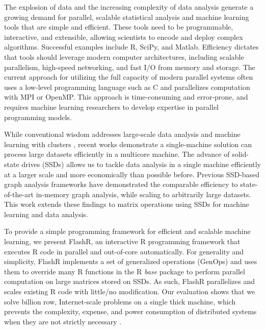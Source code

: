 
The explosion of data and the increasing complexity of data analysis
generate a growing demand for parallel, scalable statistical analysis
and machine learning tools that are simple and efficient.
These tools need to be programmable, interactive, and extensible,
allowing scientists to encode and deploy complex algorithms.
Successful examples include R, SciPy, and Matlab.  Efficiency dictates that
tools should leverage modern computer architectures, including scalable
parallelism, high-speed networking, and fast I/O from memory and storage.
The current approach for utilizing the full
capacity of modern parallel systems often uses a low-level programming
language such as C and parallelizes computation with MPI or OpenMP.
This approach is time-consuming and error-prone, and requires machine learning
researchers to develop expertise in parallel programming models.


While conventional wisdom addresses large-scale data analysis and machine
learning with clusters
\cite{mapreduce,spark,systemml,tensorflow,petuum,graphlab}, recent works
\cite{flashgraph,gridgraph,Matveev17,hotos} demonstrate a single-machine
solution can process large datasets efficiently in a multicore
machine. The advance of solid-state drives (SSDs) allows us to tackle data
analysis in a single machine efficiently at a larger scale and more economically
than possible before. Previous SSD-based graph analysis frameworks
\cite{flashgraph, gridgraph, graphene}
have demonstrated the comparable efficiency to state-of-the-art in-memory graph
analysis, while scaling to arbitrarily large datasets. This work extends
these findings to matrix operations using SSDs for machine learning and
data analysis.


To provide a simple programming framework for efficient and scalable machine
learning, we present FlashR, an interactive R programming framework that
executes R code in parallel and out-of-core automatically. For
generality and simplicity, FlashR implements
a set of generalized operations (GenOps) and uses them to override many
R functions in the R \textit{base} package to perform parallel computation on
large matrices stored on SSDs. As such, FlashR parallelizes and scales
existing R code with little/no modification.
Our evaluation shows that we solve billion row, Internet-scale
problems on a single thick machine, which prevents the complexity,
expense, and power consumption of distributed systems when they are
not strictly necessary \cite{hotos}.

